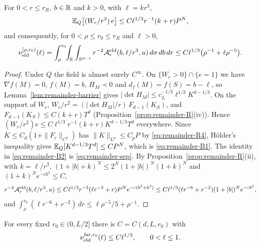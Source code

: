 \begin{lemma}\label{lem:remainder-B}
For $0<r\le r_R$, $b\in\mathbb R$ and $k>0$, with $\ell=kr^3$,
\begin{equation}\label{eq:remainder-B1}
\mathbb E_Q\bigl[(W_r/r^2)\,e\bigr]\le C\ell^{1/3}r^{-1}(k+r)P^N,
\end{equation}
and consequently, for $0<\rho\le r_0\le r_R$ and $\ell>0$,
\begin{equation}\label{eq:remainder-B2}
\nu_{\mathrm{eld}}^{[\rho,r_0)}(\ell)=\int_\rho^{r_0}\!\!\int_\mathbb R\int_{S^{d-1}}r^{-2}\mathcal A^{\mathrm{eld}}_r(b,\ell/r^3,u)\,d\sigma\,db\,dr\le C\ell^{1/3}\bigl(\rho^{-1}+\ell\rho^{-5}\bigr).
\end{equation}
\end{lemma}

\begin{proof}
Under $Q$ the field is almost surely $C^\infty$. On $\{W_r>0\}\cap\{e=1\}$ we have $\nabla f(M)=0$, $f(M)=b$, $H_M\prec0$ and $d_f(M)=f(S)=b-\ell$, so Lemma~\ref{lem:remainder-barrier} gives $|\det H_M|\le c_L^{-1/3}\ell^{1/3}K^{d-1/3}$. On the support of $W_r$, $W_r/r^2=(|\det H_M|/r)\,F_{d-1}(K_S)$, and $F_{d-1}(K_S)\le C(k+r)T^d$ (Proposition~\ref{prop:remainder-R}(iv)). Hence $(W_r/r^2)e\le C\ell^{1/3}r^{-1}(k+r)K^{d-1/3}T^d$ everywhere. Since $K\le C_d(1+\|F_r\|_{C^3})$ has $\|K\|_{L^p}\le C_pP$ by \eqref{eq:remainder-R4}, H\"older's inequality gives $\mathbb E_Q[K^{d-1/3}T^d]\le CP^N$, which is \eqref{eq:remainder-B1}. The identity in \eqref{eq:remainder-B2} is \eqref{eq:remainder-sep}. By Proposition~\ref{prop:remainder-R}(ii), with $k=\ell/r^3$, $(1+|b|+k)^N\le2^N(1+|b|)^N(1+k)^N$ and $(1+k)^Ne^{-ck^2}\le C$,
\[
r^{-2}\mathcal A^{\mathrm{eld}}_r(b,\ell/r^3,u)\le C\ell^{1/3}r^{-3}(\ell r^{-3}+r)P^Ne^{-c(b^2+k^2)}\le C\ell^{1/3}(\ell r^{-6}+r^{-2})(1+|b|)^Ne^{-cb^2},
\]
and $\int_\rho^{r_0}(\ell r^{-6}+r^{-2})\,dr\le\ell\rho^{-5}/5+\rho^{-1}$.
\end{proof}

\begin{lemma}\label{lem:remainder-far}
For every fixed $r_0\in(0,L/2]$ there is $C=C(d,L,r_0)$ with
\begin{equation}\label{eq:remainder-F}
\nu_{\mathrm{eld}}^{\mathrm{far},r_0}(\ell)\le C\ell^{1/3},\qquad 0<\ell\le1 .
\end{equation}
\end{lemma}

